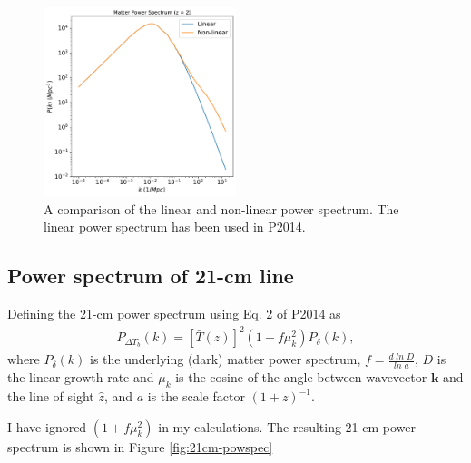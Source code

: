 \documentclass[12pt]{article}
\numberwithin{equation}{section}
\begin{document}
\begin{figure}
	\centering
	\includegraphics[width=0.5\textwidth]{matpowspec_2}
	\caption{A comparison of the linear and non-linear power spectrum. The linear power spectrum has been used in P2014.}
	\label{fig:matpowspec}
\end{figure}


\subsection{Power spectrum of 21-cm line}
Defining the 21-cm power spectrum using Eq. 2 of P2014 as 
\begin{align}
P_{\Delta T_b}(k) = [\bar{T}(z)]^2 (1 + f\mu_k^2)P_\delta(k),
\end{align}
where $ P_\delta(k) $ is the underlying (dark) matter power spectrum, $ f = \frac{d\;ln\; D}{ln\;a}$, $ D $ is the linear growth rate and $ \mu_k$ is the cosine of the angle between wavevector $ \textbf{k} $ and the line of sight $ \hat{z} $, and $ a $ is the scale factor $ (1 + z)^{-1} $.


I have ignored $ (1 + f\mu_k^2) $ in my calculations. The resulting 21-cm power spectrum is shown in Figure \ref{fig:21cm-powspec}
\end{document}
